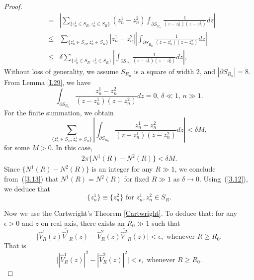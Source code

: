 \documentclass[10pt,a4paper]{article}
\theoremstyle{plain}
\theoremstyle{definition}
\theoremstyle{remark}
\numberwithin{equation}{section}
\begin{document}
\begin{proof}
\begin{eqnarray*}
&=&|\sum_{\{{z^{1}_{n}\in S_{R}},{z^{1}_{n}\in S_{R}}\}}(z_{n}^{1}-z_{n}^{2})\int_{\partial S_{R_{n}}}\frac{1}{(z-z_{n}^{1})(z-z_{n}^{2})}dz|\\
&\leq&\sum_{\{{z^{1}_{n}\in S_{R}},{z^{1}_{n}\in S_{R}}\}}|z_{n}^{1}-z_{n}^{2}||\int_{\partial S_{R_{n}}}\frac{1}{(z-z_{n}^{1})(z-z_{n}^{2})}dz|\\
&\leq&\delta\sum_{\{{z^{1}_{n}\in S_{R}},{z^{1}_{n}\in S_{R}}\}}|\int_{\partial S_{R_{n}}}\frac{1}{(z-z_{n}^{1})(z-z_{n}^{2})}dz|,
\end{eqnarray*}
Without loss of generality, we assume $S_{R_{n}}$ is a square of width $2$, and $|\partial S_{R_{n}}|=8$. From Lemma \ref{L29}, we have 
$$\int_{\partial S_{R_{n}}}\frac{z_{n}^{1}-z_{n}^{2}}{(z-z_{n}^{1})(z-z_{n}^{2})}dz=0,\,\delta\ll1,\,n\gg1.$$
For the finite summation, we obtain
$$\sum_{\{{z^{1}_{n}\in S_{R}},{z^{1}_{n}\in S_{R}}\}}|\int_{\partial S_{R_{n}}}\frac{z_{n}^{1}-z_{n}^{2}}{(z-z_{n}^{1})(z-z_{n}^{2})}dz|<\delta M,$$
for some $M>0$.
In this case,
\begin{eqnarray}\label{3.13}
2\pi \{N^{1}(R)-N^{2}(R)\}<\delta M.
\end{eqnarray}
Since $\{N^{1}(R)-N^{2}(R)\}$ is an integer for any $R\gg1$, we conclude from~(\ref{3.13}) that $N^{1}(R)=N^{2}(R)$ for fixed $R\gg1$ as $\delta\rightarrow0$.
Using~(\ref{3.12}), we deduce that 
\begin{equation} 
\{z_{n}^{1}\}\equiv\{z_{n}^{2}\} \mbox{ for } z_{n}^{1},z_{n}^{2}\in S_{R}.
\end{equation}


\par
Now we use the Cartwright's Theorem \ref{Cartwright}. To deduce that: for any $\epsilon>0$ and $z$ on real axis, there exists an $R_{0}\gg1$ such that
\begin{equation}
\big|\hat{V}^{1}_{R}(z)\overline{\hat{V}^{1}}_{R}(z)-\hat{V}^{2}_{R}(z)\overline{\hat{V}^{2}}_{R}(z)\big|<\epsilon,\mbox{ whenever }R\geq R_{0}.
\end{equation}
That is 
\begin{equation}
\big||\hat{V}^{1}_{R}(z)|^{2}-|\hat{V}^{2}_{R}(z)|^{2}\big|<\epsilon,\mbox{ whenever }R\geq R_{0}.
\end{equation}









\end{proof}
\end{document}

